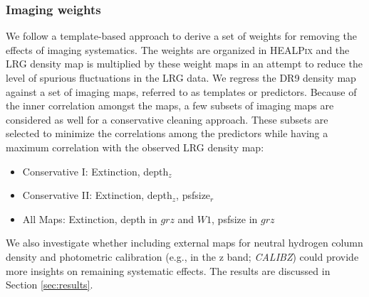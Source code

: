 \subsubsection{Imaging weights}
We follow a template-based approach to derive a set of weights for removing the effects of imaging systematics. The weights are organized in \textsc{HEALPix} and the LRG density map is multiplied by these weight maps in an attempt to reduce the level of spurious fluctuations in the LRG data. We regress the DR9 density map against a set of imaging maps, referred to as templates or predictors. Because of the inner correlation amongst the maps, a few subsets of imaging maps are considered as well for a conservative cleaning approach. These subsets are selected to minimize the correlations among the predictors while having a maximum correlation with the observed LRG density map:
\begin{itemize}
\item Conservative I: Extinction, depth$_{z}$
\item Conservative II: Extinction, depth$_{z}$, psfsize$_{r}$
\item All Maps: Extinction, depth in $grz$ and $W1$, psfsize in $grz$
\end{itemize}
We also investigate whether including external maps for neutral hydrogen column density \citep{2016A&A...594A.116H} and photometric calibration (e.g., in the z band; \textit{CALIBZ}) could provide more insights on remaining systematic effects. The results are discussed in Section \ref{sec:results}.


